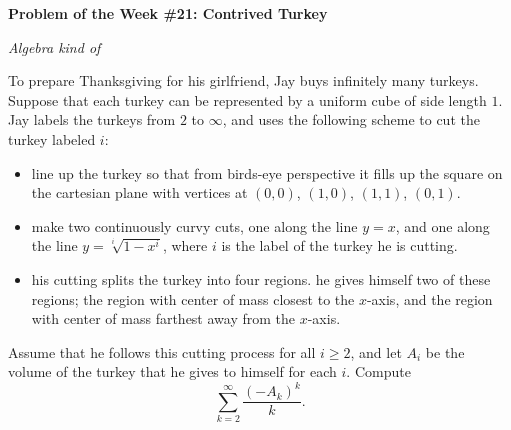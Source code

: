 \begin{potw}\vspace{5pt}
{\large\textbf{Problem of the Week \#21: Contrived Turkey}}\vspace{5pt}

\textit{Algebra kind of}\V

To prepare Thanksgiving for his girlfriend, Jay buys infinitely many turkeys. Suppose that each turkey can be represented by a uniform cube of side length $1$. Jay labels the turkeys from $2$ to $\infty$, and uses the following scheme to cut the turkey labeled $i$:
\begin{itemize}
    \item line up the turkey so that from birds-eye perspective it fills up the square on the cartesian plane with vertices at $(0,0)$, $(1,0)$, $(1,1)$, $(0,1)$. 
    \item make two continuously curvy cuts, one along the line $y=x$, and one along the line $y=\sqrt[i]{1-x^i}$, where $i$ is the label of the turkey he is cutting. 
    \item his cutting splits the turkey into four regions. he gives himself two of these regions; the region with center of mass closest to the $x$-axis, and the region with center of mass farthest away from the $x$-axis. 
\end{itemize}

Assume that he follows this cutting process for all $i\geq 2$, and let $A_i$ be the volume of the turkey that he gives to himself for each $i$. Compute
\[\sum_{k=2}^{\infty}\frac{(-A_k)^k}{k}.\]
\end{potw}\V
